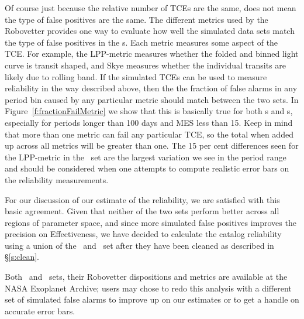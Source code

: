 Of course just because the relative number of TCEs are the same, does not mean the type of false positives are the same.  The different metrics used by the Robovetter provides one way to evaluate how well the simulated data sets match the type of false positives in the \opstce s.  Each metric measures some aspect of the TCE. For example, the LPP-metric measures whether the folded and binned light curve is transit shaped, and Skye measures whether the individual transits are likely due to rolling band.  If the simulated TCEs can be used to measure reliability in the way described above, then the the fraction of false alarms in any period bin caused by any particular metric should match between the two sets.  In Figure~\ref{f:fractionFailMetric} we show that this is basically true for both \invtce s and \scrtce s, especially for periods longer than 100 days and MES less than 15.  Keep in mind that more than one metric can fail any particular TCE, so the total when added up across all metrics will be greater than one.  The 15 per cent differences seen for the LPP-metric in the \invtce\ set are the largest variation we see in the period range and should be considered when one attempts to compute realistic error bars on the reliability measurements. 

For our discussion of our estimate of the reliability, we are satisfied with this basic agreement. Given that neither of the two sets perform better across all regions of parameter space, and since more simulated false positives improves the precision on Effectiveness,  we have decided to calculate the catalog reliability using a union of the \scrtce\ and \invtce\ set after they have been cleaned as described in \S\ref{s:clean}.  


Both \scrtce\ and \invtce\ sets, their Robovetter dispositions and metrics are available at the NASA Exoplanet Archive; users may chose to redo this analysis with a different set of simulated false alarms to improve up on our estimates or to get a handle on accurate error bars.   

